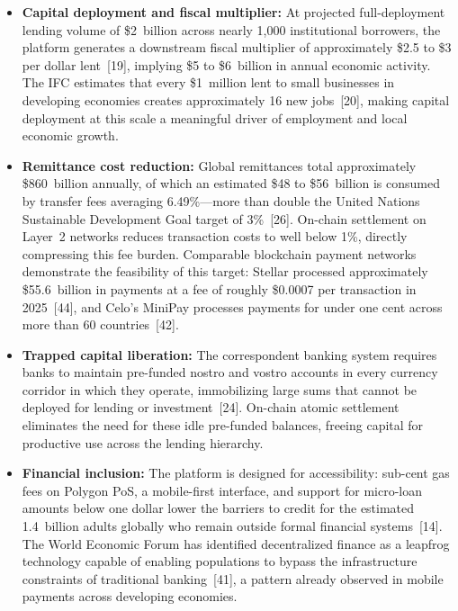 \documentclass[12pt,a4paper]{report}
\begin{document}
\begin{itemize}[noitemsep]
\item \textbf{Capital deployment and fiscal multiplier:} At projected full-deployment lending volume of \$2~billion across nearly 1,000 institutional borrowers, the platform generates a downstream fiscal multiplier of approximately \$2.5 to \$3 per dollar lent~[19], implying \$5 to \$6~billion in annual economic activity. The IFC estimates that every \$1~million lent to small businesses in developing economies creates approximately 16 new jobs~[20], making capital deployment at this scale a meaningful driver of employment and local economic growth.

\item \textbf{Remittance cost reduction:} Global remittances total approximately \$860~billion annually, of which an estimated \$48 to \$56~billion is consumed by transfer fees averaging 6.49\%---more than double the United Nations Sustainable Development Goal target of 3\%~[26]. On-chain settlement on Layer~2 networks reduces transaction costs to well below 1\%, directly compressing this fee burden. Comparable blockchain payment networks demonstrate the feasibility of this target: Stellar processed approximately \$55.6~billion in payments at a fee of roughly \$0.0007 per transaction in 2025~[44], and Celo's MiniPay processes payments for under one cent across more than 60 countries~[42].

\item \textbf{Trapped capital liberation:} The correspondent banking system requires banks to maintain pre-funded nostro and vostro accounts in every currency corridor in which they operate, immobilizing large sums that cannot be deployed for lending or investment~[24]. On-chain atomic settlement eliminates the need for these idle pre-funded balances, freeing capital for productive use across the lending hierarchy.

\item \textbf{Financial inclusion:} The platform is designed for accessibility: sub-cent gas fees on Polygon PoS, a mobile-first interface, and support for micro-loan amounts below one dollar lower the barriers to credit for the estimated 1.4~billion adults globally who remain outside formal financial systems~[14]. The World Economic Forum has identified decentralized finance as a leapfrog technology capable of enabling populations to bypass the infrastructure constraints of traditional banking~[41], a pattern already observed in mobile payments across developing economies.


\end{itemize}
\end{document}
